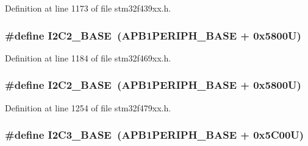 Definition at line 1173 of file stm32f439xx.\+h.

\subsubsection[{\texorpdfstring{I2\+C2\+\_\+\+B\+A\+SE}{I2C2_BASE}}]{\setlength{\rightskip}{0pt plus 5cm}\#define I2\+C2\+\_\+\+B\+A\+SE~({\bf A\+P\+B1\+P\+E\+R\+I\+P\+H\+\_\+\+B\+A\+SE} + 0x5800\+U)}\hypertarget{group___peripheral__memory__map_ga04bda70f25c795fb79f163b633ad4a5d}{}\label{group___peripheral__memory__map_ga04bda70f25c795fb79f163b633ad4a5d}


Definition at line 1184 of file stm32f469xx.\+h.

\subsubsection[{\texorpdfstring{I2\+C2\+\_\+\+B\+A\+SE}{I2C2_BASE}}]{\setlength{\rightskip}{0pt plus 5cm}\#define I2\+C2\+\_\+\+B\+A\+SE~({\bf A\+P\+B1\+P\+E\+R\+I\+P\+H\+\_\+\+B\+A\+SE} + 0x5800\+U)}\hypertarget{group___peripheral__memory__map_ga04bda70f25c795fb79f163b633ad4a5d}{}\label{group___peripheral__memory__map_ga04bda70f25c795fb79f163b633ad4a5d}


Definition at line 1254 of file stm32f479xx.\+h.

\subsubsection[{\texorpdfstring{I2\+C3\+\_\+\+B\+A\+SE}{I2C3_BASE}}]{\setlength{\rightskip}{0pt plus 5cm}\#define I2\+C3\+\_\+\+B\+A\+SE~({\bf A\+P\+B1\+P\+E\+R\+I\+P\+H\+\_\+\+B\+A\+SE} + 0x5\+C00\+U)}\hypertarget{group___peripheral__memory__map_ga4e8b9198748235a1729e1e8f8f24983b}{}\label{group___peripheral__memory__map_ga4e8b9198748235a1729e1e8f8f24983b}


